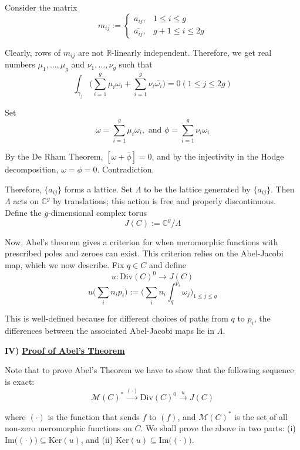 \documentclass[11pt,a4paper]{article}
\begin{document}
Consider the matrix
$$m_{ij} := \begin{cases}
a_{ij}, & 1\leq i \leq g\\
\overline{a_{ij}}, & g+1\leq i\leq 2g
\end{cases}$$

Clearly, rows of $m_{ij}$ are not $\mathbb{R}$-linearly independent. Therefore, we get real numbers $\mu_1, \ldots, \mu_g$ and $\nu_1, \ldots, \nu_g$ such that
$$\int_{\gamma_j} \Bigg(\sum_{i=1}^{g}{\mu_i\omega_i} + \sum_{i=1}^{g}{\nu_i\overline{\omega_i}}
  \Bigg) = 0   (1\leq j\leq 2g)$$

  Set $$\omega = \sum_{i=1}^{g}{\mu_i\omega_i}, \text{ and } \phi = \sum_{i=1}^{g}{\nu_i\omega_i}$$

  By the De Rham Theorem, $[\omega + \overline{\phi}] = 0$, and by the injectivity in the Hodge decomposition, $\omega = \phi = 0$. Contradiction.

Therefore, $\{a_{ij}\}$ forms a lattice. Set $\Lambda$ to be the lattice generated by $\{a_{ij}\}$. Then $\Lambda$ acts on $\mathbb{C}^g$ by translations; this action is free and properly discontinuous. Define the $g$-dimensional complex torus
$$J(C):= \mathbb{C}^g/\Lambda$$

Now, Abel's theorem gives a criterion for when meromorphic functions with prescribed poles and zeroes can exist. This criterion relies on the Abel-Jacobi map, which we now describe. Fix $q\in C$ and define
$$u: \text{Div}(C)^0 \rightarrow J(C)$$
$$u\bigg(\sum_{i}{n_ip_i}\bigg) := \Bigg(\sum_{i}{n_i\int_{q}^{p_i}\omega_j}\Bigg)_{1\leq j\leq g}$$

This is well-defined because for different choices of paths from $q$ to $p_i$, the differences between the associated Abel-Jacobi maps lie in $\Lambda$.

\textbf{IV)} \underline{\textbf{Proof of Abel's Theorem}}

Note that to prove Abel's Theorem we have to show that the following sequence is exact:
$$\mathcal{M}(C)^* \xrightarrow{(\cdot)} \text{Div}(C)^0 \xrightarrow{u} J(C)$$

where $(\cdot)$ is the function that sends $f$ to $(f)$, and $\mathcal{M}(C)^*$ is the set of all non-zero meromorphic functions on $C$. We shall prove the above in two parts: (i) $\text{Im}\big((\cdot)\big) \subseteq \text{Ker}(u)$, and (ii) $\text{Ker}(u) \subseteq \text{Im}\big((\cdot)\big)$.
\end{document}
